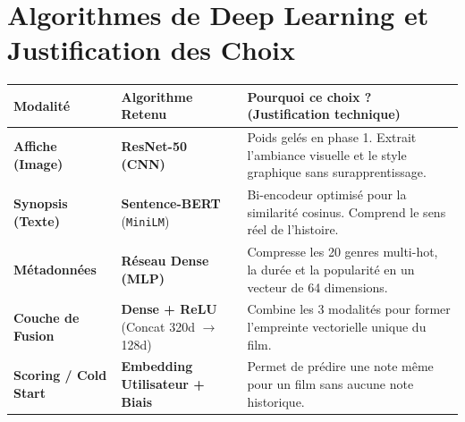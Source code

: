 \documentclass[10pt,a4paper]{article}
\begin{document}
\section{Algorithmes de Deep Learning et Justification des Choix}
\begin{table}[h]
\centering
\small
\begin{tabular}{@{}lp{4cm}p{8cm}@{}}
\toprule
\textbf{Modalité} & \textbf{Algorithme Retenu} & \textbf{Pourquoi ce choix ? (Justification technique)} \\ \midrule
\textbf{Affiche (Image)} & \textbf{ResNet-50 (CNN)} & Poids gelés en phase 1. Extrait l'ambiance visuelle et le style graphique sans surapprentissage. \\
\textbf{Synopsis (Texte)} & \textbf{Sentence-BERT} (\texttt{MiniLM}) & Bi-encodeur optimisé pour la similarité cosinus. Comprend le sens réel de l'histoire. \\
\textbf{Métadonnées} & \textbf{Réseau Dense (MLP)} & Compresse les 20 genres multi-hot, la durée et la popularité en un vecteur de 64 dimensions. \\
\textbf{Couche de Fusion} & \textbf{Dense + ReLU} (Concat 320d $\to$ 128d) & Combine les 3 modalités pour former l'empreinte vectorielle unique du film. \\
\textbf{Scoring / Cold Start} & \textbf{Embedding Utilisateur + Biais} & Permet de prédire une note même pour un film sans aucune note historique. \\ \bottomrule
\end{tabular}
\end{table}
\end{document}
